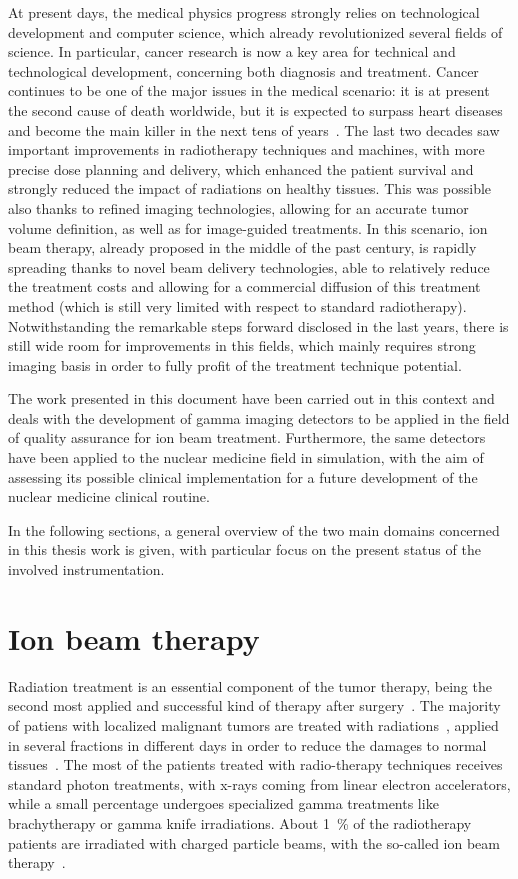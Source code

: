 At present days, the medical physics progress strongly relies on technological development and computer science, which already revolutionized several fields of science. In particular, cancer research is now a key area for technical and technological development, concerning both diagnosis and treatment\parencite{Webb2009}. Cancer continues to be one of the major issues in the medical scenario: it is at present the second cause of death worldwide, but it is expected to surpass heart diseases and become the main killer in the next tens of years~\parencite{Jemal2010, Thun2010}. The last two decades saw important improvements in radiotherapy techniques and machines, with more precise dose planning and delivery, which enhanced the patient survival and strongly reduced the impact of radiations on healthy tissues. This was possible also thanks to refined imaging technologies, allowing for an accurate tumor volume definition, as well as for image-guided treatments. In this scenario, ion beam therapy, already proposed in the middle of the past century, is rapidly spreading thanks to novel beam delivery technologies, able to relatively reduce the treatment costs and allowing for a commercial diffusion of this treatment method (which is still very limited with respect to standard radiotherapy). Notwithstanding the remarkable steps forward disclosed in the last years, there is still wide room for improvements in this fields, which mainly requires strong imaging basis in order to fully profit of the treatment technique potential.

The work presented in this document have been carried out in this context and deals with the development of gamma imaging detectors to be applied in the field of quality assurance for ion beam treatment. Furthermore, the same detectors have been applied to the nuclear medicine field in simulation, with the aim of assessing its possible clinical implementation for a future development of the nuclear medicine clinical routine. 

In the following sections, a general overview of the two main domains concerned in this thesis work is given, with particular focus on the present status of the involved instrumentation.       
  

\section{Ion beam therapy}\label{chap1::sec::ionBeamTher}
Radiation treatment is an essential component of the tumor therapy, being the second most applied and successful kind of therapy after surgery~\parencite{Schardt2010}. The majority of patiens with localized malignant tumors are treated with radiations~\parencite{Durante2009, Baskar2012, Moding2013}, applied in several fractions in different days in order to reduce the damages to normal tissues~\parencite{Bentzen2006}. The most of the patients treated with radio-therapy techniques receives standard photon treatments, with x-rays coming from linear electron accelerators, while a small percentage undergoes specialized gamma treatments like brachytherapy or gamma knife irradiations. About 1~\% of the radiotherapy patients are irradiated with charged particle beams, with the so-called ion beam therapy~\parencite{Durante2016}.

